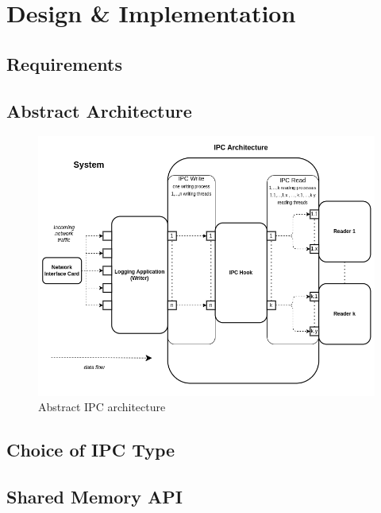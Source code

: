 %
%
\chapter{Design \& Implementation}
\label{sec:design}

\section{Requirements}

\section{Abstract Architecture}

\begin{figure}[p]
    \caption[IPC Architecture]{Abstract \ac{IPC} architecture }
    \includegraphics[width=\textwidth]{images/meta_ipc_architecture.png}
\end{figure}

\section{Choice of IPC Type}

\section{Shared Memory API}

